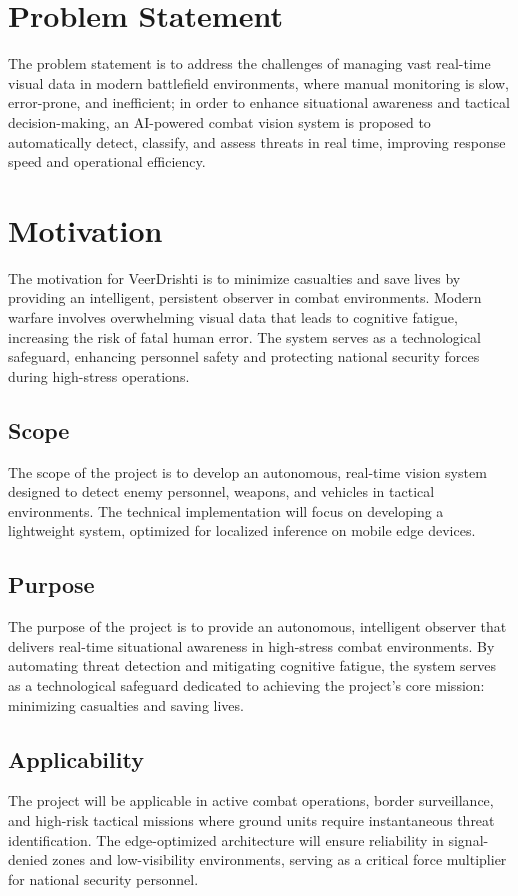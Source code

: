 \label{end:overview}
\section{Problem Statement}\label{sec:problem}
The problem statement is to address the challenges of managing vast real-time visual data in modern
battlefield environments, where manual monitoring is slow, error-prone, and inefficient; in order to
enhance situational awareness and tactical decision-making, an AI-powered combat vision system is
proposed to automatically detect, classify, and assess threats in real time, improving response
speed and operational efficiency.

\label{end:problem}
\section{Motivation}\label{sec:motivation}
The motivation for VeerDrishti is to minimize casualties and save lives by providing an intelligent,
persistent observer in combat environments. Modern warfare involves overwhelming visual data that
leads to cognitive fatigue, increasing the risk of fatal human error. The system serves as a
technological safeguard, enhancing personnel safety and protecting national security forces during
high-stress operations.

\subsection{Scope}
The scope of the project is to develop an autonomous, real-time vision system designed to detect
enemy personnel, weapons, and vehicles in tactical environments. The technical implementation will
focus on developing a lightweight system, optimized for localized inference on mobile edge devices.

\subsection{Purpose}
The purpose of the project is to provide an autonomous, intelligent observer that delivers real-time
situational awareness in high-stress combat environments. By automating threat detection and
mitigating cognitive fatigue, the system serves as a technological safeguard dedicated to achieving
the project's core mission: minimizing casualties and saving lives.

\subsection{Applicability}
The project will be applicable in active combat operations, border surveillance, and high-risk
tactical missions where ground units require instantaneous threat identification. The edge-optimized
architecture will ensure reliability in signal-denied zones and low-visibility environments, serving
as a critical force multiplier for national security personnel. \vspace{6pt}

